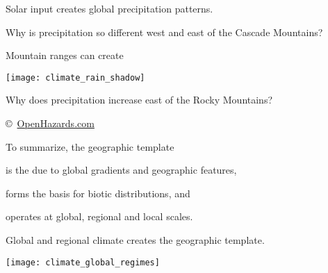 \documentclass[t]{beamer}
\begin{document}
{
\begin{frame}[t,plain]{Solar input creates global precipitation patterns.}
\end{frame}
}

{
\begin{frame}[t,plain]
\end{frame}
}

{
\begin{frame}[t,plain]
\end{frame}
}

{
\begin{frame}[t,plain]{Why is precipitation so different west and east of the Cascade Mountains?}
\end{frame}
}


\begin{frame}[t,plain]{Mountain ranges can create }
	\begin{center}
		\texttt{[image: climate\_rain\_shadow]}
	\end{center}
\end{frame}

{
\begin{frame}[t,plain]{Why does precipitation increase east of the Rocky Mountains?}
\end{frame}
}

{
	\begin{frame}[t]
		
		\vfilll
		
		\hfill \tiny \copyright~\href{http://www.openhazards.com/blogs/wardsn/hurricane-wind-forecasting-1-what-and-how}{OpenHazards.com}
	\end{frame}
}

\begin{frame}[t,plain]{To summarize, the geographic template}

	\hangpara is the  due to global gradients and geographic features,
	
	\hangpara forms the basis for biotic distributions, and
	
	\hangpara operates at global, regional and local scales.
\end{frame}

\begin{frame}[t,plain]{Global and regional climate creates the geographic template.}
	
	\begin{center}
		\texttt{[image: climate\_global\_regimes]}
	\end{center}
	
\end{frame}
\end{document}
